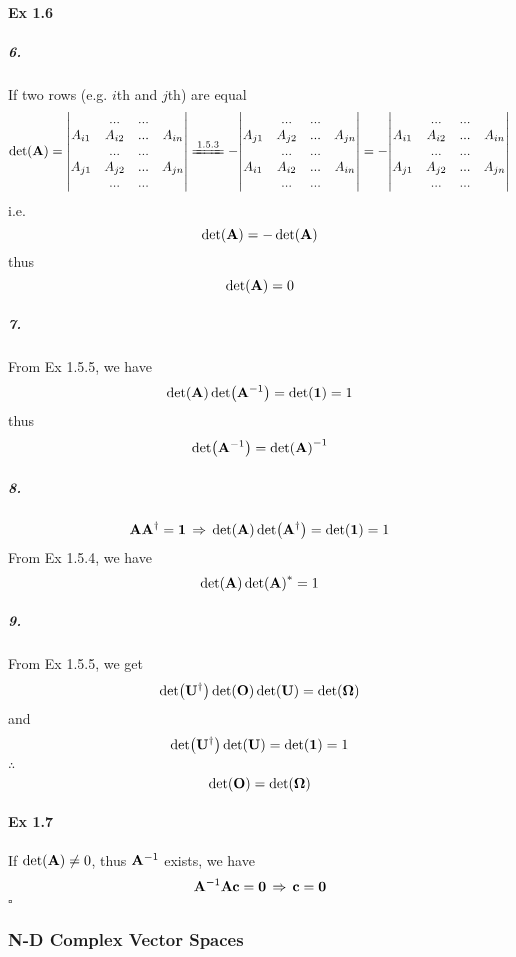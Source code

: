 \documentclass[a4paper]{article}
\DeclareMathOperator{\dra}{\Rightarrow}
\newcommand{\ex}[1]{\paragraph{Ex #1}}
\newcommand{\subex}[1]{\subparagraph{#1}}
\newcommand{\iden}{{\large \bm{1}}}
\numberwithin{equation}{section}
\begin{document}
\ex{1.6}
\subex{6.}
If two rows (e.g. $ i $th and $ j $th) are equal
\begin{equation}\label{key}
\det(\vb{A}) = \mqty|  & ... & ... & \\
      A_{i1} & A_{i2} & ... & A_{in}\\
        & ... & ... & \\
      A_{j1} & A_{j2} & ... & A_{jn}\\
        & ... & ... & \\|
\xlongequal{1.5.3} -\mqty|  & ... & ... & \\
A_{j1} & A_{j2} & ... & A_{jn}\\
& ... & ... & \\
A_{i1} & A_{i2} & ... & A_{in}\\
& ... & ... & \\|
= - \mqty|  & ... & ... & \\
A_{i1} & A_{i2} & ... & A_{in}\\
& ... & ... & \\
A_{j1} & A_{j2} & ... & A_{jn}\\
& ... & ... & \\|
\end{equation}
i.e.
\begin{equation}\label{key}
\det(\vb{A}) = -\det(\vb{A})
\end{equation}
thus
\begin{equation}\label{key}
\det(\vb{A}) = 0
\end{equation}
\subex{7.}
From Ex 1.5.5, we have
\begin{equation}\label{key}
\det(\vb{A})\det(\vb{A}^{-1}) = \det(\iden) = 1
\end{equation}
thus
\begin{equation}\label{key}
\det(\vb{A}^{-1}) = \det(\vb{A})^{-1}
\end{equation}
\subex{8.}
\begin{equation}\label{key}
\vb{A}\vb{A}^\dagger = \iden \;\dra\; \det(\vb{A})\det(\vb{A}^\dagger) = \det(\iden) = 1
\end{equation}
From Ex 1.5.4, we have
\begin{equation}\label{key}
\det(\vb{A})\det(\vb{A})^* = 1
\end{equation}
\subex{9.}
From Ex 1.5.5, we get
\begin{equation}\label{key}
\det(\vb{U}^\dagger)\det(\vb{O})\det(\vb{U}) = \det(\bm\Omega)
\end{equation}
and
\begin{equation}\label{key}
\det(\vb{U}^\dagger)\det(\vb{U}) = \det(\iden) = 1
\end{equation}
$ \therefore $
\begin{equation}\label{key}
\det(\vb{O}) = \det(\bm\Omega)
\end{equation}

\ex{1.7}
If $ \det(\vb{A}) \neq 0 $, thus $ \vb{A}^{-1} $ exists, we have
\begin{equation}\label{key}
\vb{A}^{-1}\vb{A}\vb{c} = \bm{0} \;\dra\; \vb{c} = \bm{0}
\end{equation}
$  \square $

\subsubsection{N-D Complex Vector Spaces}
\end{document}

